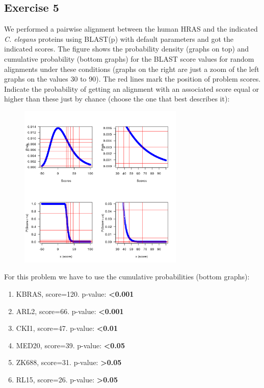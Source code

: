 \subsection{Exercise 5}
We performed a pairwise alignment between the human HRAS and the indicated \textit{C. elegans} proteins using BLAST(p) with default parameters and got the indicated scores. The figure shows the probability density (graphs on top) and cumulative probability (bottom graphs) for the BLAST score values for random alignments under these conditions (graphs on the right are just a zoom of the left graphs on the values 30 to 90). The red lines mark the position of problem scores. Indicate the probability of getting an alignment with an associated score equal or higher than these just by chance (choose the one that best describes it):

\begin{figure}[htbp]
\centering
\includegraphics[width = 0.7\textwidth]{figs/exam-ex5.png}
\end{figure}

For this problem we have to use the cumulative probabilities (bottom graphs):
\begin{enumerate}
\item  KBRAS, score=120. p-value: \textbf{<0.001}
\item ARL2, score=66. p-value: \textbf{<0.001}
\item CKI1, score=47. p-value: \textbf{<0.01}
\item MED20, score=39. p-value: \textbf{<0.05}
\item ZK688, score=31. p-value: \textbf{>0.05}
\item RL15, score=26. p-value: \textbf{>0.05}
\end{enumerate}

